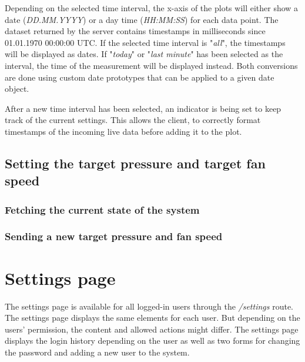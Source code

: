 Depending on the selected time interval, the x-axis of the plots will either show a date (\textit{DD.MM.YYYY}) or a day time (\textit{HH:MM:SS}) for each data point. The dataset returned by the server contains timestamps in milliseconds since 01.01.1970 00:00:00 UTC. If the selected time interval is "\textit{all}", the timestamps will be displayed as dates. If "\textit{today}" or "\textit{last minute}" has been selected as the interval, the time of the measurement will be displayed instead. Both conversions are done using custom date prototypes that can be applied to a given date object.

After a new time interval has been selected, an indicator is being set to keep track of the current settings. This allows the client, to correctly format timestamps of the incoming live data before adding it to the plot.


\subsection{Setting the target pressure and target fan speed}
\label{subsec:setting_the_target_pressure_and_target_fan_speed}


\subsubsection{Fetching the current state of the system}
\label{subsec:fetching_the_current_state_of_the_system}


\subsubsection{Sending a new target pressure and fan speed}
\label{subsec:sending_a_new_target_pressure_and_fan_speed}





\section{Settings page}
\label{sec:settings_page}

The settings page is available for all logged-in users through the \textit{/settings} route. The settings page displays the same elements for each user. But depending on the users' permission, the content and allowed actions might differ. The settings page displays the login history depending on the user as well as two forms for changing the password and adding a new user to the system.



